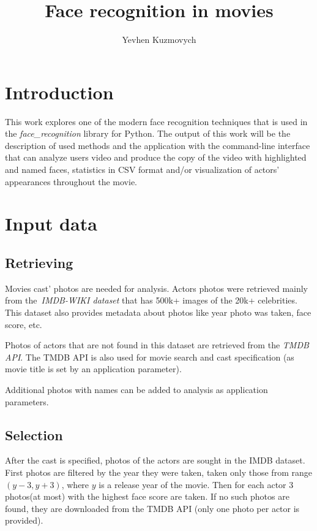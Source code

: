 \documentclass[hidelinks, english]{mvi-report}
\title{Face recognition in movies}
\author{Yevhen Kuzmovych}
\affiliation{ČVUT - FIT}
\begin{document}
\maketitle

\section{Introduction}
This work explores one of the modern face recognition techniques that is used in
the \textit{face\_recognition}\cite{face_recognition} library for Python. The output of this work will be
the description of used methods and the application with the command-line interface that can analyze users video and
produce the copy of the video with highlighted and named faces, statistics in CSV format and/or visualization of actors'
appearances throughout the movie.

\section{Input data}

\subsection{Retrieving}
Movies cast' photos are needed for analysis. Actors photos were retrieved mainly from
the~\textit{IMDB-WIKI dataset}\cite{Rothe-IJCV-2016} that has 500k+ images of the 20k+ celebrities. This dataset also
provides metadata about photos like year photo was taken, face score, etc.

Photos of actors that are not found in this dataset are retrieved from the \textit{TMDB API}\cite{tmdb-api}.
The TMDB API is also used for movie search and cast specification (as movie title is set by an application
parameter).

Additional photos with names can be added to analysis as application parameters.

\subsection{Selection}
After the cast is specified, photos of the actors are sought in the IMDB dataset. First photos are filtered by the year
they were taken, taken only those from range \( (y-3, y+3) \), where \(y\) is a release year of the movie. Then for
each actor 3 photos(at most) with the highest face score are taken. If no such photos are found, they are downloaded
from the TMDB API (only one photo per actor is provided).
\end{document}
